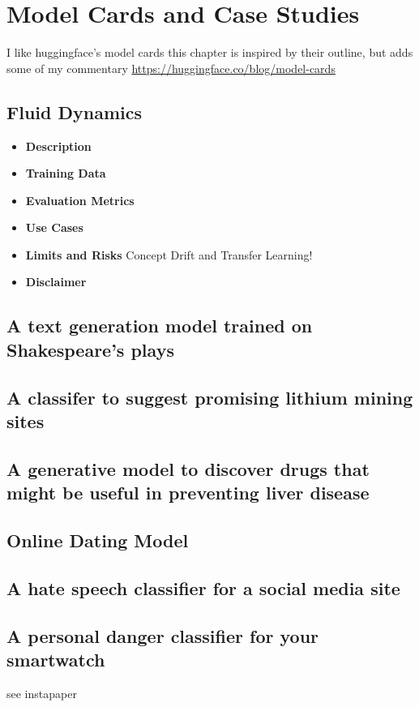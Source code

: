 \setchapterpreamble[u]{\margintoc}
\chapter{Model Cards and Case Studies}

I like huggingface's model cards this chapter is inspired by their outline, but adds some of my commentary \url{https://huggingface.co/blog/model-cards}

\section{Fluid Dynamics}

\begin{itemize}
\item \textbf{Description}
\item \textbf{Training Data} 
\item \textbf{Evaluation Metrics}
\item \textbf{Use Cases}
\item \textbf{Limits and Risks} Concept Drift and Transfer Learning!
\item \textbf{Disclaimer}
\end{itemize}

\section{A text generation model trained on Shakespeare's plays} 
\section{A classifer to suggest promising lithium mining sites}
\section{A generative model to discover drugs that might be useful in preventing liver disease}
\section{Online Dating Model}
\section{A hate speech classifier for a social media site}
\section{A personal danger classifier for your smartwatch} see instapaper
